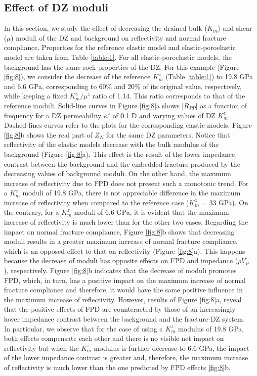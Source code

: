 \documentclass[draft]{agujournal2019}
\begin{document}
\subsection{Effect of DZ moduli}
In this section, we study the effect of decreasing the drained bulk ($K_m$) and shear ($\mu$) moduli of the DZ and background on reflectivity and normal fracture compliance. Properties for the reference elastic model and elastic-poroelastic model are taken from Table \ref{table:1}. For all elastic-poroelastic models, the background has the same rock properties of the DZ.
For this example  (Figure \ref{fig:8}), we consider the decrease of the reference $K_m^z$ (Table \ref{table:1}) to 19.8 GPa and 6.6 GPa, corresponding to  60\%  and 20\% of its original value, respectively,  while keeping a fixed $K_m^z/\mu^z$ ratio of 1.14. This ratio corresponds to that of the reference moduli.
Solid-line curves in Figure \ref{fig:8}a shows  $|R_{PP}|$ as a function of frequency for a DZ permeability $ \kappa^z $ of 0.1 D and varying values of DZ $K_m^z$. Dashed-lines curves refer to the plots for the corresponding elastic models.
Figure \ref{fig:8}b shows the real part of $Z_N$ for the same DZ parameters. Notice that reflectivity of the elastic models decrease with the bulk modulus of the background (Figure \ref{fig:8}a). This effect is the result of the lower impedance  contrast between the background and the embedded fracture produced by the decreasing values of background moduli. On the other hand, the maximum increase of reflectivity due to FPD does not present such a  monotonic trend.
For a  $K_m^z$ moduli of 19.8 GPa, there is not appreciable difference in the maximum increase of reflectivity when compared to the  reference case ($K_m^z$ = 33 GPa). On the contrary, for a  $K_m^z$ moduli of 6.6 GPa, it is evident that the maximum increase of reflectivity is much lower than for the other two cases. Regarding the impact on normal fracture compliance, Figure \ref{fig:8}b shows that decreasing moduli  results in a greater maximum increase of normal fracture compliance, which is an opposed effect to that on reflectivity (Figure \ref{fig:8}a). This happens because  the decrease of moduli has opposite effects on FPD and impedance ($\rho V_P$), respectively. Figure \ref{fig:8}b indicates that the decrease of moduli promotes FPD, which, in turn, has a positive impact on the maximum increase of normal fracture compliance and therefore, it would have the same positive influence in the maximum increase of reflectivity. However, results of Figure \ref{fig:8}a, reveal that the positive effects of FPD are counteracted by those of an increasingly lower impedance contrast between the background and the fracture-DZ system. In particular, we observe that for the case of using a $K_m^z$ modulus of 19.8 GPa, both effects compensate each other and there is no visible net impact on reflectivity but when the $K_m^z$ modulus is further decrease to 6.6 GPa, the impact of the lower impedance contrast is greater and, therefore, the maximum increase of reflectivity is much lower than the one predicted by FPD effects \ref{fig:8}b.
\end{document}
